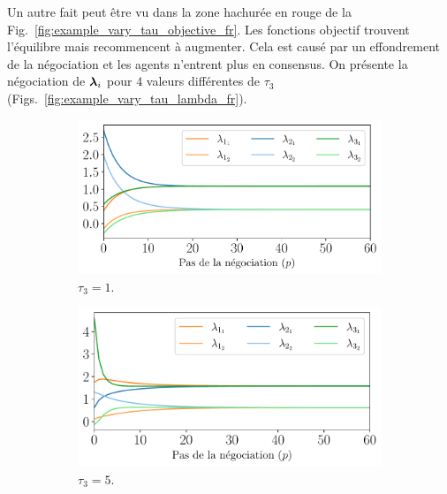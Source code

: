 \documentclass[../main.tex]{subfiles}
\begin{document}
Un autre fait peut être vu dans la zone hachurée en rouge de la Fig.~\ref{fig:example_vary_tau_objective_fr}.
Les fonctions objectif trouvent l'équilibre mais recommencent à augmenter.
Cela est causé par un effondrement de la négociation et les agents n'entrent plus en consensus.
On présente la négociation de $\boldsymbol{\lambda}_{i}$ pour $4$ valeurs différentes de $\tau_{3}$ (Figs.~\ref{fig:example_vary_tau_lambda_fr}).

\begin{figure}[h]
  \centering
  \begin{subfigure}{0.45\textwidth}
    \includegraphics[width=\textwidth]{../img/example_primal_decomposition/example_vary_tau_lambda_tau_1.0_fr.pdf}
    \caption{$\tau_{3}=1$.}\label{fig:example_vary_tau_lambda_tau_1}
  \end{subfigure}
  \begin{subfigure}{0.45\textwidth}
    \includegraphics[width=\textwidth]{../img/example_primal_decomposition/example_vary_tau_lambda_tau_5.0_fr.pdf}
    \caption{$\tau_{3}=5$.}\label{fig:example_vary_tau_lambda_tau_5}
  \end{subfigure}
  \\~\\
  \begin{subfigure}{0.45\textwidth}

\end{subfigure}
\end{figure}
\end{document}
